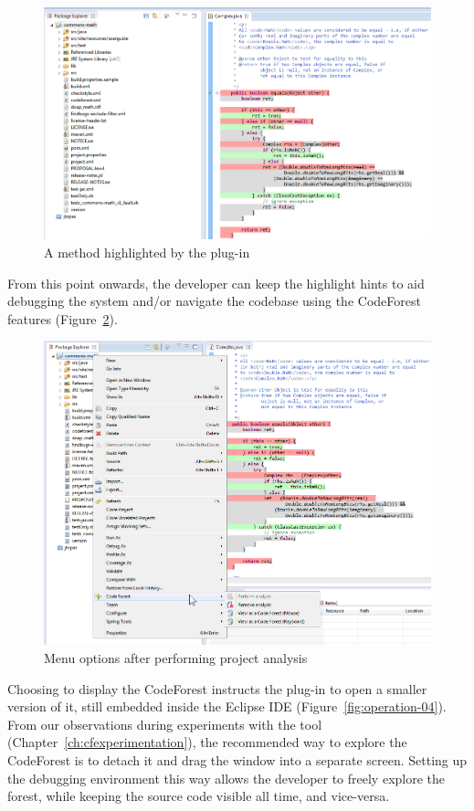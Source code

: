 \begin{figure}[h!]
\centerline{\includegraphics[width=.8\linewidth]{figures/commons_math_complex_02_red_green_grey}}
\caption{A method highlighted by the plug-in}\label{fig:operation-02}
\end{figure}

From this point onwards, the developer can keep the highlight
hints to aid debugging the system and/or navigate the codebase using the
CodeForest features (Figure~\ref{fig:operation-03}).

\begin{figure}[ht]
\centerline{\includegraphics[width=.8\linewidth]{figures/commons_math_complex_03_open_view}}
\caption{Menu options after performing project analysis}\label{fig:operation-03}
\end{figure}

Choosing to display the CodeForest instructs the plug-in to open a smaller
version of it, still embedded inside the Eclipse IDE
(Figure~\ref{fig:operation-04}). From our observations during experiments with
the tool (Chapter~\ref{ch:cfexperimentation}), the recommended way to explore
the CodeForest is to detach it and drag the window into a separate screen.
Setting up the debugging environment this way allows the developer to freely
explore the forest, while keeping the source code visible all time, and
vice-versa.

